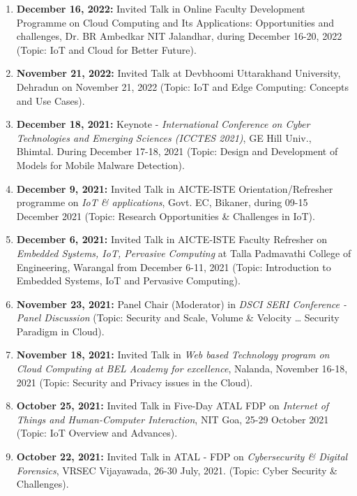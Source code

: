 \begin{enumerate} %
\item
\textbf{December 16, 2022:} Invited Talk in Online Faculty Development Programme on Cloud Computing and Its Applications: Opportunities and challenges, Dr. BR Ambedkar NIT Jalandhar, during December 16-20, 2022 (Topic: IoT and Cloud for Better Future).

\item
\textbf{November 21, 2022:} Invited Talk at Devbhoomi Uttarakhand University, Dehradun on November 21, 2022 (Topic: IoT and Edge Computing: Concepts and Use Cases).

\item
\textbf{December 18, 2021:} Keynote - \textit{International Conference on Cyber Technologies and Emerging Sciences (ICCTES 2021)}, GE Hill Univ., Bhimtal. During December 17-18, 2021 (Topic: Design and Development of Models for Mobile Malware Detection).

\item
\textbf{December 9, 2021:} Invited Talk in AICTE-ISTE Orientation/Refresher programme on \textit{IoT \& applications}, Govt. EC, Bikaner, during 09-15 December 2021 (Topic: Research Opportunities \& Challenges in IoT).

\item
\textbf{December 6, 2021:} Invited Talk in AICTE-ISTE Faculty Refresher on \textit{Embedded Systems, IoT, Pervasive Computing} at Talla Padmavathi College of Engineering, Warangal from December 6-11, 2021 (Topic: Introduction to Embedded Systems, IoT and Pervasive Computing).

\item
\textbf{November 23, 2021:} Panel Chair (Moderator) in \textit{DSCI SERI Conference - Panel Discussion} (Topic: Security and Scale, Volume \& Velocity … Security Paradigm in Cloud).

\item
\textbf{November 18, 2021:} Invited Talk in \textit{Web based Technology program on Cloud Computing at BEL Academy for excellence}, Nalanda, November 16-18, 2021 (Topic: Security and Privacy issues in the Cloud).

\item
\textbf{October 25, 2021:} Invited Talk in Five-Day ATAL FDP on \textit{Internet of Things and Human-Computer Interaction}, NIT Goa, 25-29 October 2021 (Topic: IoT Overview and Advances).

\item
\textbf{October 22, 2021:} Invited Talk in ATAL - FDP on \textit{Cybersecurity \& Digital Forensics}, VRSEC Vijayawada, 26-30 July, 2021. (Topic: Cyber Security & Challenges).


\end{enumerate}
